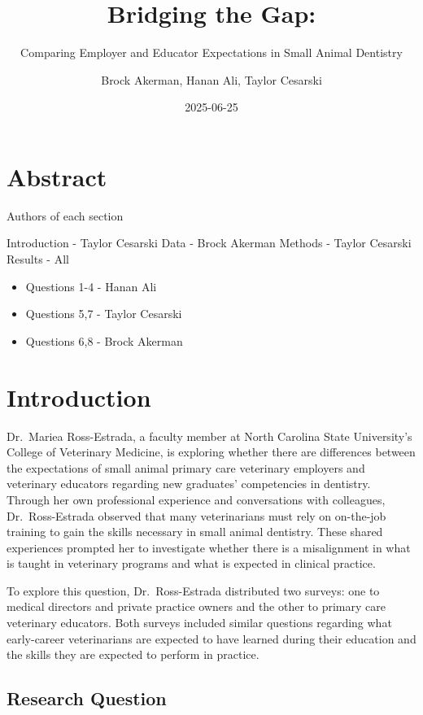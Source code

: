 \documentclass[
  11pt,
  letterpaper,
  DIV=11,
  numbers=noendperiod]{scrartcl}
\title{Bridging the Gap:}
\subtitle{Comparing Employer and Educator Expectations in Small Animal
Dentistry}
\author{Brock Akerman, Hanan Ali, Taylor Cesarski}
\date{2025-06-25}
\providecommand{\tightlist}{%
  \setlength{\itemsep}{0pt}\setlength{\parskip}{0pt}}
\numberwithin{figure}{section}
\renewcommand*\contentsname{Table of contents}
\newcommand\contentsname{Table of contents}
\begin{document}
\maketitle

\renewcommand*\contentsname{Table of contents}
{
\hypersetup{linkcolor=}
\setcounter{tocdepth}{2}
\tableofcontents
}

\section{Abstract}\label{abstract}

Authors of each section

Introduction - Taylor Cesarski Data - Brock Akerman Methods - Taylor
Cesarski Results - All

\begin{itemize}
\tightlist
\item
  Questions 1-4 - Hanan Ali
\item
  Questions 5,7 - Taylor Cesarski
\item
  Questions 6,8 - Brock Akerman
\end{itemize}

\section{Introduction}\label{introduction}

Dr.~Mariea Ross-Estrada, a faculty member at North Carolina State
University's College of Veterinary Medicine, is exploring whether there
are differences between the expectations of small animal primary care
veterinary employers and veterinary educators regarding new graduates'
competencies in dentistry. Through her own professional experience and
conversations with colleagues, Dr.~Ross-Estrada observed that many
veterinarians must rely on on-the-job training to gain the skills
necessary in small animal dentistry. These shared experiences prompted
her to investigate whether there is a misalignment in what is taught in
veterinary programs and what is expected in clinical practice.

To explore this question, Dr.~Ross-Estrada distributed two surveys: one
to medical directors and private practice owners and the other to
primary care veterinary educators. Both surveys included similar
questions regarding what early-career veterinarians are expected to have
learned during their education and the skills they are expected to
perform in practice.

\subsection{Research Question}\label{research-question}
\end{document}
